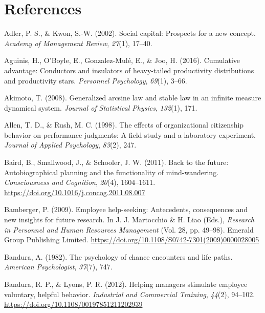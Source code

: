 \documentclass[english,,man]{apa6}
\begin{document}
\newpage

\hypertarget{references}{%
\section{References}\label{references}}

\setlength{\parindent}{-0.5in}
\setlength{\leftskip}{0.5in}

\hypertarget{refs}{}
\leavevmode\hypertarget{ref-adler_social_2002}{}%
Adler, P. S., \& Kwon, S.-W. (2002). Social capital: Prospects for a new concept. \emph{Academy of Management Review}, \emph{27}(1), 17--40.

\leavevmode\hypertarget{ref-aguinis_cumulative_2016}{}%
Aguinis, H., O'Boyle, E., Gonzalez-Mulé, E., \& Joo, H. (2016). Cumulative advantage: Conductors and insulators of heavy-tailed productivity distributions and productivity stars. \emph{Personnel Psychology}, \emph{69}(1), 3--66.

\leavevmode\hypertarget{ref-akimoto_generalized_2008}{}%
Akimoto, T. (2008). Generalized arcsine law and stable law in an infinite measure dynamical system. \emph{Journal of Statistical Physics}, \emph{132}(1), 171.

\leavevmode\hypertarget{ref-allen1998effects}{}%
Allen, T. D., \& Rush, M. C. (1998). The effects of organizational citizenship behavior on performance judgments: A field study and a laboratory experiment. \emph{Journal of Applied Psychology}, \emph{83}(2), 247.

\leavevmode\hypertarget{ref-baird_back_2011}{}%
Baird, B., Smallwood, J., \& Schooler, J. W. (2011). Back to the future: Autobiographical planning and the functionality of mind-wandering. \emph{Consciousness and Cognition}, \emph{20}(4), 1604--1611. \url{https://doi.org/10.1016/j.concog.2011.08.007}

\leavevmode\hypertarget{ref-martocchio_employee_2009}{}%
Bamberger, P. (2009). Employee help-seeking: Antecedents, consequences and new insights for future research. In J. J. Martocchio \& H. Liao (Eds.), \emph{Research in Personnel and Human Resources Management} (Vol. 28, pp. 49--98). Emerald Group Publishing Limited. \url{https://doi.org/10.1108/S0742-7301(2009)0000028005}

\leavevmode\hypertarget{ref-bandura_psychology_1982}{}%
Bandura, A. (1982). The psychology of chance encounters and life paths. \emph{American Psychologist}, \emph{37}(7), 747.

\leavevmode\hypertarget{ref-bandura_helping_2012}{}%
Bandura, R. P., \& Lyons, P. R. (2012). Helping managers stimulate employee voluntary, helpful behavior. \emph{Industrial and Commercial Training}, \emph{44}(2), 94--102. \url{https://doi.org/10.1108/00197851211202939}
\end{document}
